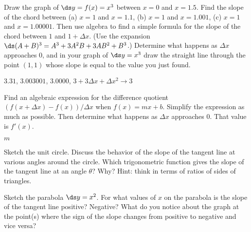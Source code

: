 \begin{exercises}
\begin{exercise}
Draw the graph of $\ds y=f(x)=x^3$ between $x=0$ and $x=1.5$.  Find the slope
of the chord between (a) $x=1$ and $x=1.1$, (b) $x=1$ and $x=1.001$, (c)
$x=1$ and $x=1.00001$.  Then use algebra to find a simple formula for the
slope of the chord between $1$ and $1+\Delta x$.  (Use the expansion
$\ds (A+B)^3=A^3+3A^2B+3AB^2+B^3$.)  Determine what happens as $\Delta x$
approaches 0, and in your graph of $\ds y=x^3$ draw the straight line through
the point $(1,1)$ whose slope is equal to the value you just found.
\begin{answer} $3.31$, $3.003001$, $3.0000$,\hfill\break
 $3+3\Delta x+\Delta x^2\rightarrow3$
\end{answer}\end{exercise}

\begin{exercise}
Find an algebraic expression for the difference quotient $(f(x+\Delta
x)-f(x))/\Delta x$ when $f(x)=mx+b$.  Simplify the expression as
much as possible.  Then determine what happens as $\Delta x$ approaches 0.
That value is $f'(x)$.
\label{ex:derivative of a line}
\begin{answer} $m$
\end{answer}\end{exercise}

\begin{exercise} Sketch the unit circle.  Discuss the behavior of the slope
of the tangent line at various angles around the circle.  Which
trigonometric function gives the slope of the tangent line at an angle
$\theta$?  Why? Hint: think in terms of ratios of sides of
  triangles.
\end{exercise}

 \begin{exercise} Sketch the parabola $\ds y=x^2$.  For what values of $x$ on the parabola
 is the slope of the tangent line positive?  Negative?  What do you notice
 about the graph at the point(s) where the sign of the slope changes from
 positive to negative and vice versa?
\end{exercise}

\end{exercises}
